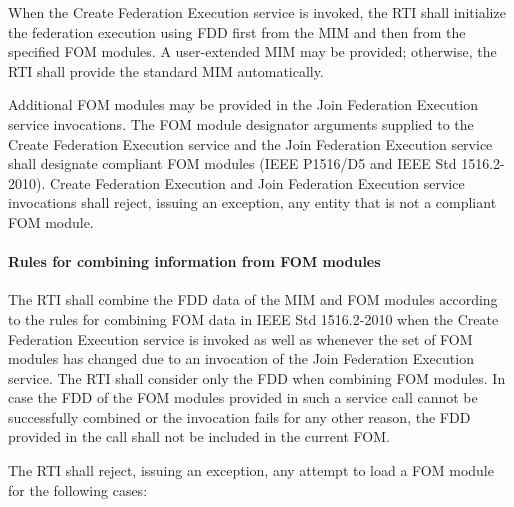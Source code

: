 When the Create Federation Execution service is invoked, the RTI shall initialize the federation execution using FDD first from the MIM and then from the specified FOM modules. A user-extended MIM may be provided; otherwise, the RTI shall provide the standard MIM automatically.

\clearpage

Additional FOM modules may be provided in the Join Federation Execution service invocations. The FOM module designator arguments supplied to the Create Federation Execution service and the Join Federation Execution service shall designate compliant FOM modules (IEEE P1516/D5 and IEEE Std 1516.2-2010). Create Federation Execution and Join Federation Execution service invocations shall reject, issuing an exception, any entity that is not a compliant FOM module.

\paragraph{Rules for combining information from FOM modules}

The RTI shall combine the FDD data of the MIM and FOM modules according to the rules for combining FOM data in IEEE Std 1516.2-2010 when the Create Federation Execution service is invoked as well as whenever the set of FOM modules has changed due to an invocation of the Join Federation Execution service. The RTI shall consider only the FDD when combining FOM modules. In case the FDD of the FOM modules provided in such a service call cannot be successfully combined or the invocation fails for any other reason, the FDD provided in the call shall not be included in the current FOM.

The RTI shall reject, issuing an exception, any attempt to load a FOM module for the following cases:

